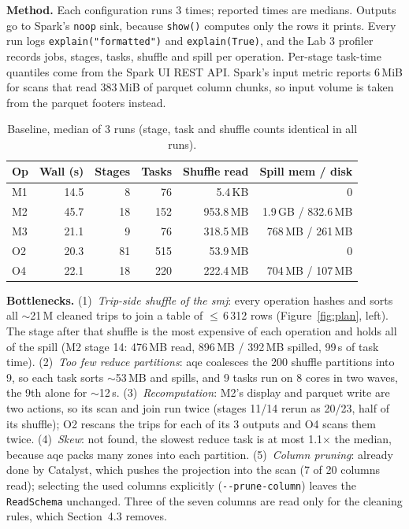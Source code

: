 \documentclass[sigconf]{acmart}
\begin{document}
\textbf{Method.} Each configuration runs 3 times; reported times are medians.
Outputs go to Spark's \texttt{noop} sink, because \texttt{show()} computes only
the rows it prints. Every run logs \texttt{explain("formatted")} and \texttt{explain(True)},
and the Lab 3 profiler records jobs, stages, tasks, shuffle and spill per
operation. Per-stage task-time quantiles come from the Spark UI REST API\cite{spark-api}.
Spark's input metric reports 6\,MiB for scans that read 383\,MiB of parquet column
chunks, so input volume is taken from the parquet footers instead.

\begin{table}[!t]
      \centering
      \footnotesize
      \setlength{\tabcolsep}{3pt}
      \begin{tabular}{lrrrrr}
            \toprule Op & Wall (s) & Stages & Tasks & Shuffle read & Spill mem / disk    \\
            \midrule M1 & 14.5     & 8      & 76    & 5.4\,KB      & 0                   \\
            M2          & 45.7     & 18     & 152   & 953.8\,MB    & 1.9\,GB / 832.6\,MB \\
            M3          & 21.1     & 9      & 76    & 318.5\,MB    & 768\,MB / 261\,MB   \\
            O2          & 20.3     & 81     & 515   & 53.9\,MB     & 0                   \\
            O4          & 22.1     & 18     & 220   & 222.4\,MB    & 704\,MB / 107\,MB   \\
            \bottomrule
      \end{tabular}
      \caption{Baseline, median of 3 runs (stage, task and shuffle counts identical
            in all runs).}
      \label{tab:baseline}
\end{table}

\textbf{Bottlenecks.} (1)~\emph{Trip-side shuffle of the \gls{smj}}: every
operation hashes and sorts all $\sim$21\,M cleaned trips to join a table of $\le$\,6\,312
rows (Figure~\ref{fig:plan}, left). The stage after that shuffle is the most expensive
of each operation and holds all of the spill (M2 stage 14: 476\,MB read, 896\,MB
/ 392\,MB spilled, 99\,s of task time). (2)~\emph{Too few reduce partitions}: \gls{aqe}
coalesces the 200 shuffle partitions into 9, so each task sorts $\sim$53\,MB
and spills, and 9 tasks run on 8 cores in two waves, the 9th alone for $\sim$12\,s.
(3)~\emph{Recomputation}: M2's display and parquet write are two actions, so its
scan and join run twice (stages 11/14 rerun as 20/23, half of its shuffle); O2
rescans the trips for each of its 3 outputs and O4 scans them twice. (4)~\emph{Skew}:
not found, the slowest reduce task is at most 1.1$\times$ the median, because \gls{aqe}
packs many zones into each partition. (5)~\emph{Column pruning}: already
done by Catalyst, which pushes the projection into the scan (7 of 20 columns
read); selecting the used columns explicitly (\texttt{-{}-prune-column})
leaves the \texttt{ReadSchema} unchanged. Three of the seven columns are read
only for the cleaning rules, which Section~4.3 removes.
\end{document}
